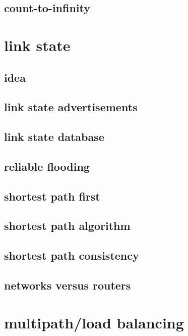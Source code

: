 \subsection{count-to-infinity}

\section{link state}
\subsection{idea}

\subsection{link state advertisements}

\subsection{link state database}

\subsection{reliable flooding}


\subsection{shortest path first}


\subsection{shortest path algorithm}


\subsection{shortest path consistency}


\subsection{networks versus routers}
 

\section{multipath/load balancing}


